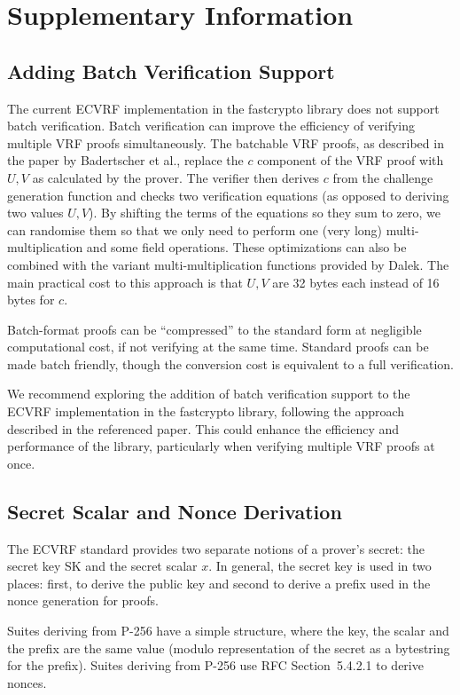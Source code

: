 \section{Supplementary Information}
\subsection{Adding Batch Verification Support}
The current ECVRF implementation in the fastcrypto library does not support batch verification. Batch verification can improve the efficiency of verifying multiple VRF proofs simultaneously. The batchable VRF proofs, as described in the paper by Badertscher et al.\cite{batch-ecvrf}, replace the $c$ component of the VRF proof with $U,V$ as calculated by the prover. The verifier then derives $c$ from the challenge generation function and checks two verification equations (as opposed to deriving two values $U,V$). By shifting the terms of the equations so they sum to zero, we can randomise them so that we only need to perform one (very long) multi-multiplication and some field operations. These optimizations can also be combined with the variant multi-multiplication functions provided by Dalek. The main practical cost to this approach is that $U,V$ are 32 bytes each instead of 16 bytes for $c$.

Batch-format proofs can be ``compressed'' to the standard form at negligible computational cost, if not verifying at the same time. Standard proofs can be made batch friendly, though the conversion cost is equivalent to a full verification.

We recommend exploring the addition of batch verification support to the ECVRF implementation in the fastcrypto library, following the approach described in the referenced paper. This could enhance the efficiency and performance of the library, particularly when verifying multiple VRF proofs at once.

\subsection{Secret Scalar and Nonce Derivation}
The ECVRF standard provides two separate notions of a prover’s secret: the secret key SK and the secret scalar $x$. In general, the secret key is used in two places: first, to derive the public key and second to derive a prefix used in the nonce generation for proofs.

Suites deriving from P-256 have a simple structure, where the key, the scalar and the prefix are the same value (modulo representation of the secret as a bytestring for the prefix). Suites deriving from P-256 use RFC Section~5.4.2.1 to derive nonces.

